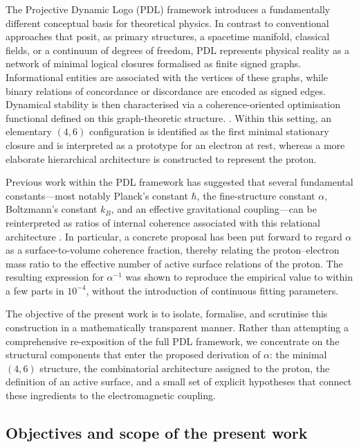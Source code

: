 \documentclass[11pt,a4paper]{article}
\theoremstyle{plain}
\theoremstyle{definition}
\theoremstyle{remark}
\begin{document}
The Projective Dynamic Logo (PDL) framework introduces a fundamentally different conceptual basis for theoretical physics. In contrast to conventional approaches that posit, as primary structures, a spacetime manifold, classical fields, or a continuum of degrees of freedom, PDL represents physical reality as a network of minimal logical closures formalised as finite signed graphs. Informational entities are associated with the vertices of these graphs, while binary relations of concordance or discordance are encoded as signed edges. Dynamical stability is then characterised via a coherence-oriented optimisation functional defined on this graph-theoretic structure.
\cite{Laubscher2026IntroPDL,Laubscher2026PDL_English,Laubscher2026LDP_French}. Within this setting, an elementary \((4,6)\) configuration is identified as the first minimal stationary closure and is interpreted as a prototype for an electron at rest, whereas a more elaborate hierarchical architecture is constructed to represent the proton.

Previous work within the PDL framework has suggested that several fundamental constants—most notably Planck’s constant \(\hbar\), the fine-structure constant \(\alpha\), Boltzmann’s constant \(k_B\), and an effective gravitational coupling—can be reinterpreted as ratios of internal coherence associated with this relational architecture
\cite{Laubscher2026PDL_English,Laubscher2026LDP_French}. In particular, a concrete proposal has been put forward to regard \(\alpha\) as a surface-to-volume coherence fraction, thereby relating the proton–electron mass ratio to the effective number of active surface relations of the proton. The resulting expression for \(\alpha^{-1}\) was shown to reproduce the empirical value to within a few parts in \(10^{-4}\), without the introduction of continuous fitting parameters.

The objective of the present work is to isolate, formalise, and scrutinise this construction in a mathematically transparent manner. Rather than attempting a comprehensive re-exposition of the full PDL framework, we concentrate on the structural components that enter the proposed derivation of \(\alpha\): the minimal \((4,6)\) structure, the combinatorial architecture assigned to the proton, the definition of an active surface, and a small set of explicit hypotheses that connect these ingredients to the electromagnetic coupling.

\subsection{Objectives and scope of the present work}
\end{document}
